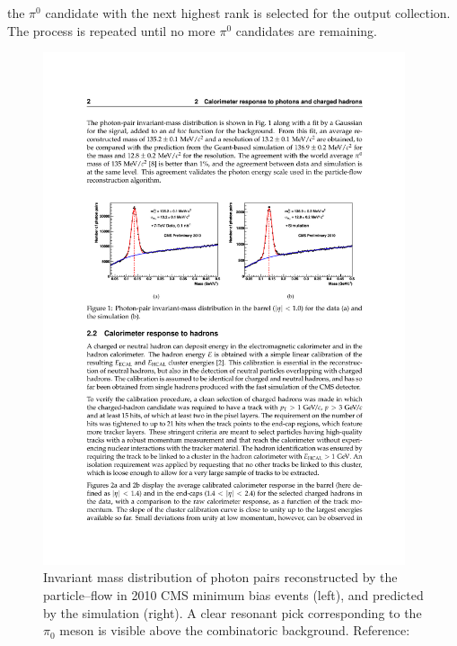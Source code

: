 the $\pi^0$ candidate with the next highest rank is selected for the output
collection.  The process is repeated until no more $\pi^0$ candidates are
remaining.
\begin{figure}[thbp]
  \centering
  \includegraphics[width=0.95\textwidth]{tanc_chapter/figures/PFPiZeroRes.pdf}
  \caption[Invariant mass distribution of PF photon pairs]{Invariant mass
  distribution of photon pairs reconstructed by the particle--flow in 2010 CMS
  minimum bias events (left), and predicted by the simulation (right).  A clear
  resonant pick corresponding to the $\pi_0$ meson is visible above the
  combinatoric background. Reference:~\cite{CMS-PAS-PFT-10-002}}
  \label{fig:PFPiZeroRes}
\end{figure}

